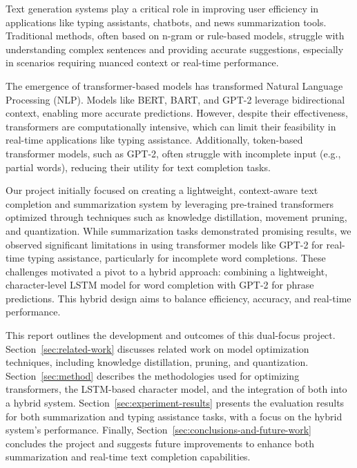 Text generation systems play a critical role in improving user efficiency in applications like typing assistants,
chatbots, and news summarization tools.
Traditional methods, often based on n-gram or rule-based models, struggle with understanding complex sentences
and providing accurate suggestions, especially in scenarios requiring nuanced context or real-time performance.

The emergence of transformer-based models has transformed Natural Language Processing (NLP). Models like BERT, BART,
and GPT-2 leverage bidirectional context, enabling more accurate predictions.
However, despite their effectiveness, transformers are computationally intensive,
which can limit their feasibility in real-time applications like typing assistance.
Additionally, token-based transformer models, such as GPT-2, often struggle with incomplete input (e.g., partial words),
reducing their utility for text completion tasks.

Our project initially focused on creating a lightweight, context-aware text completion and summarization system
by leveraging pre-trained transformers optimized through techniques such as knowledge distillation, movement pruning, and quantization.
While summarization tasks demonstrated promising results, we observed significant limitations
in using transformer models like GPT-2 for real-time typing assistance, particularly for incomplete word completions.
These challenges motivated a pivot to a hybrid approach:
combining a lightweight, character-level LSTM model for word completion with GPT-2 for phrase predictions.
This hybrid design aims to balance efficiency, accuracy, and real-time performance.

This report outlines the development and outcomes of this dual-focus project.
Section~\ref{sec:related-work} discusses related work on model optimization techniques, including knowledge distillation, pruning, and quantization.
Section~\ref{sec:method} describes the methodologies used for optimizing transformers, the LSTM-based character model,
and the integration of both into a hybrid system.
Section~\ref{sec:experiment-results} presents the evaluation results for both summarization and typing assistance tasks,
with a focus on the hybrid system's performance.
Finally, Section~\ref{sec:conclusions-and-future-work} concludes the project and suggests future improvements
to enhance both summarization and real-time text completion capabilities.

